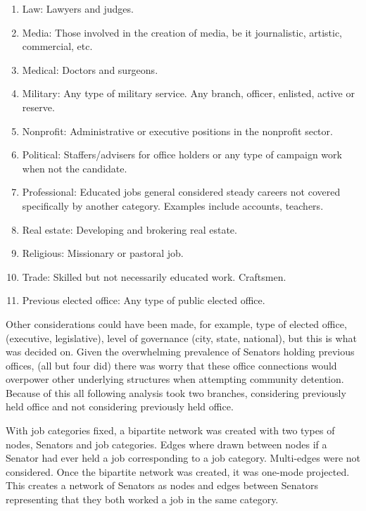 \documentclass[11pt,twocolumn]{article}
\begin{document}
\begin{enumerate}
\item Law: Lawyers and judges.

\item Media: Those involved in the creation of media, be it journalistic, artistic, commercial, etc.

\item Medical: Doctors and surgeons.

\item Military: Any type of military service. Any branch, officer, enlisted, active or reserve.

\item Nonprofit: Administrative or executive positions in the nonprofit sector.

\item Political: Staffers/advisers for office holders or any type of campaign work when not the candidate. 

\item Professional: Educated jobs general considered steady careers not covered specifically by another category. Examples include accounts, teachers.

\item Real estate: Developing and brokering real estate.

\item Religious: Missionary or pastoral job.

\item Trade: Skilled but not necessarily educated work. Craftsmen.

\item Previous elected office: Any type of public elected office.
\end{enumerate}

Other considerations could have been made, for example, type of elected office, (executive, legislative), level of governance (city, state, national), but this is what was decided on. Given the overwhelming prevalence of Senators holding previous offices, (all but four did) there was worry that these office connections would overpower other underlying structures when attempting community detention. Because of this all following analysis took two branches, considering previously held office and not considering previously held office.

With job categories fixed, a bipartite network was created with two types of nodes, Senators and job categories. Edges where drawn between nodes if a Senator had ever held a job corresponding to a job category. Multi-edges were not considered. Once the bipartite network was created, it was one-mode projected. This creates a network of Senators as nodes and edges between Senators representing that they both worked a job in the same category.
\end{document}
